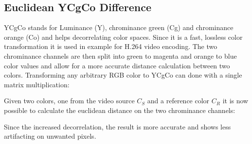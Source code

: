 \subsection{Euclidean YCgCo Difference}

YCgCo stands for Luminance (Y), chrominance green (Cg) and chrominance orange 
(Co) and helps decorrelating color spaces. Since it is a fast, lossless color 
transformation it is used in example for H.264 video encoding. The two 
chrominance channels are then split into green to magenta and orange to blue 
color values and allow for a more accurate distance calculation between two 
colors.
\newline
Transforming any arbitrary RGB color to YCgCo can done with a single matrix 
multiplication:


Given two colors, one from the video source $C_S$ and a reference color $C_R$ 
it is now possible to calculate the euclidean distance on the two chrominance 
channels:


Since the increased decorrelation, the result is more accurate and shows less 
artifacting on unwanted pixels.

